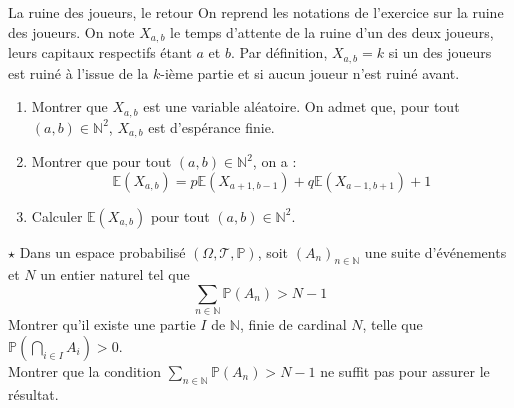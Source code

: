 \documentclass[french,a4paper]{article}
\renewcommand{\P}{\mathbb{P}}
\newcommand{\N}{\mathbb{N}}
\newcommand{\E}{\mathbb{E}}
\theoremstyle{plain}
\theoremstyle{definition}
\theoremstyle{remark}
\begin{document}
\begin{ex}{La ruine des joueurs, le retour}
	On reprend les notations de l'exercice sur la ruine des joueurs. On note $X_{a,b}$ le temps d'attente de la ruine d'un des deux joueurs, leurs capitaux respectifs étant $a$ et $b$. Par définition, $X_{a,b}=k$ si un des joueurs est ruiné à l'issue de la $k$-ième partie et si aucun joueur n'est ruiné avant.
	\begin{enumerate}
		\item Montrer que $X_{a,b}$ est une variable aléatoire. On admet que, pour tout $(a,b)\in\N^2$, $X_{a,b}$ est d'espérance finie.
		\item Montrer que pour tout $(a,b)\in\N^2$, on a : $$\E(X_{a,b})=p\E(X_{a+1,b-1})+q\E(X_{a-1,b+1})+1$$
		\item Calculer $\E(X_{a,b})$ pour tout $(a,b)\in\N^2$.
	\end{enumerate}
\end{ex}

\begin{ex}{$\star$}
	Dans un espace probabilisé $(\Omega,\mathcal{T},\P)$, soit $(A_n)_{n\in\N}$ une suite d'événements et $N$ un entier naturel tel que $$\sum_{n\in\N}\P(A_n)>N-1$$ Montrer qu'il existe une partie $I$ de $\N$, finie de cardinal $N$, telle que $\P\displaystyle\left(\bigcap_{i\in I}A_i\right)>0$. \\ Montrer que la condition $\displaystyle\sum_{n\in\N}\P(A_n)>N-1$ ne suffit pas pour assurer le résultat.
\end{ex}
\end{document}
